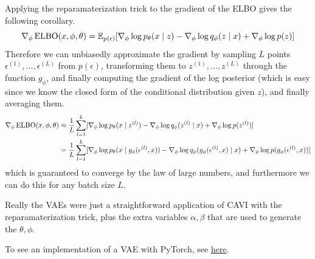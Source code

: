   \begin{corollary}
    \label{thm:auto-encoding-vb-aevb-algorithm}
    Applying the reparamaterization trick to the gradient of the ELBO gives the following corollary. 
    \begin{equation}
      \nabla_\phi \operatorname{ELBO}(x, \phi, \theta) = \mathbb{E}_{p(\epsilon)}[\nabla_\phi \log p_\theta (x \mid z) - \nabla_\phi \log q_\phi (z \mid x) + \nabla_\phi \log p(z)]
    \end{equation}
    Therefore we can unbiasedly approximate the gradient by sampling $L$ points $\epsilon^{(1)}, \ldots, \epsilon^{(L)}$ from $p(\epsilon)$, transforming them to $z^{(1)}, \ldots, z^{(L)}$ through the function $g_\phi$, and finally computing the gradient of the log posterior (which is easy since we know the closed form of the conditional distribution given $z$), and finally averaging them. 
    \begin{align*}
      \nabla_\phi \operatorname{ELBO}(x, \phi, \theta) & \approx \frac{1}{L} \sum_{l=1}^L [\nabla_\phi \log p_\theta (x \mid z^{(l)}) - \nabla_\phi \log q_\phi (z^{(l)} \mid x) + \nabla_\phi \log p(z^{(l)})] \\
                                         & = \frac{1}{L} \sum_{l=1}^L [\nabla_\phi \log p_\theta (x \mid g_\phi (\epsilon^{(l)}, x)) - \nabla_\phi \log q_\phi (g_\phi (\epsilon^{(l)}, x) \mid x) + \nabla_\phi \log p(g_\phi (\epsilon^{(l)}, x))]
    \end{align*}
    which is guaranteed to converge by the law of large numbers, and furthermore we can do this for any batch size $L$. 
  \end{corollary}


  Really the VAEs were just a straightforward application of CAVI with the reparamaterization trick, plus the extra variables $\alpha, \beta$ that are used to generate the $\theta, \phi$. 

  \begin{algo}
    To see an implementation of a VAE with PyTorch, see \href{code/vae.html}{here}. 
  \end{algo} 

